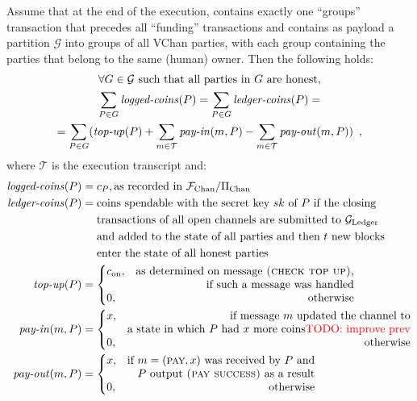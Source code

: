 \begin{theorem}
  Assume that at the end of the execution, \ledger contains exactly one
  ``groups'' transaction that precedes all ``funding'' transactions and contains
  as payload a partition $\mathcal{G}$ into groups of all VChan parties, with
  each group containing the parties that belong to the same (human) owner. Then
  the following holds:
  \begin{gather*}
    \forall G \in \mathcal{G} \text{ such that all parties in } G \text{ are
    honest}, \\
    \sum\limits_{P \in G}\text{\emph{logged-coins}}(P) = \sum\limits_{P \in
    G}\text{\emph{ledger-coins}}(P) = \\
    = \sum\limits_{P \in G}(\text{\emph{top-up}}(P) + \sum\limits_{m \in
    \mathcal{T}}\text{\emph{pay-in}}(m, P) - \sum\limits_{m \in
    \mathcal{T}}\text{\emph{pay-out}}(m, P)) \enspace,
  \end{gather*}
  where $\mathcal{T}$ is the execution transcript and:
  \begin{align*}
    \text{\emph{logged-coins}}(P) &= c_P, \text{as recorded in \fchan/\pchan} \\
    \text{\emph{ledger-coins}}(P) &= \text{coins spendable with the secret key }
    sk \text{ of } P \text{ if the closing} \\
    &\phantomrel{=} \text{transactions of all open channels are submitted to
    \ledger} \\
    &\phantomrel{=} \text{and added to the state of all parties and then } t
    \text{ new blocks } \\
    &\phantomrel{=} \text{enter the state of all honest parties} \\
    \text{\emph{top-up}}(P) &=
    \left\{\begin{array}{@{}lr@{}}
      \multirow[t]{2}{*}{$c_{\mathrm{on}},$} & \text{as determined on message
      \textsc{(check top up)},} \\
      & \text{if such a message was handled} \\
      0, & \text{otherwise}
    \end{array}\right. \\
    \text{\emph{pay-in}}(m, P) &=
    \left\{\begin{array}{@{}lr@{}}
      \multirow[t]{2}{*}{$x$}, & \text{if message } m \text{ updated the
      channel to} \\
      & \text{a state in which } P \text{ had } x \text{ more coins\TODO{improve
      prev}} \\
      0, & \text{otherwise}
    \end{array}\right. \\
    \text{\emph{pay-out}}(m, P) &=
    \left\{\begin{array}{@{}lr@{}}
      \multirow[t]{2}{*}{$x$}, & \text{if } m = (\textsc{pay} , x) \text{ was
      received by } P \text{ and} \\
      & P \text{ output \textsc{(pay success)} as a result} \\
      0, & \text{otherwise}
    \end{array}\right. \\
  \end{align*}
\end{theorem}

